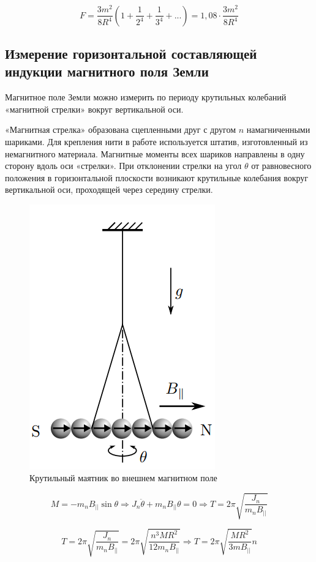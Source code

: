 \begin{equation}
    F = \frac{3m^2}{8R^4} \left( 1 + \frac{1}{2^4} + \frac{1}{3^4} + ...\right) = 1,08 \cdot \frac{3m^2}{8R^4}
\end{equation}

\subsection{Измерение горизонтальной составляющей индукции магнитного поля Земли}

Магнитное поле Земли можно измерить по периоду крутильных колебаний «магнитной стрелки» вокруг вертикальной оси. 

«Магнитная стрелка» образована сцепленными друг с другом $n$ намагниченными шариками. Для крепления нити в работе используется штатив, изготовленный из немагнитного материала. Магнитные моменты всех шариков направлены в одну сторону вдоль оси «стрелки». При отклонении стрелки на угол $\theta$ от равновесного положения в горизонтальной плоскости возникают крутильные колебания вокруг вертикальной оси, проходящей через середину стрелки.

\begin{figure}[h]
    \centering
    \includegraphics[width = 6 cm]{images/2.png}
    \caption{ Крутильный маятник во внешнем магнитном поле}
    \label{sh1}
\end{figure}

\begin{equation}
    M = -m_n B_{||} \sin{\theta} \Rightarrow J_n \ddot{\theta} + m_n B_{||} \theta = 0 \Rightarrow T = 2 \pi \sqrt{\frac{J_n}{m_n B_{||}}}
\end{equation}

\begin{equation}
    T = 2 \pi \sqrt{\frac{J_n}{m_n B_{||}}} = 2 \pi \sqrt{\frac{n^3 M R^2}{12m_n B_{||}}} \Rightarrow T = 2 \pi \sqrt{\frac{M R^2}{3 m B_{||}}} n
\end{equation}

